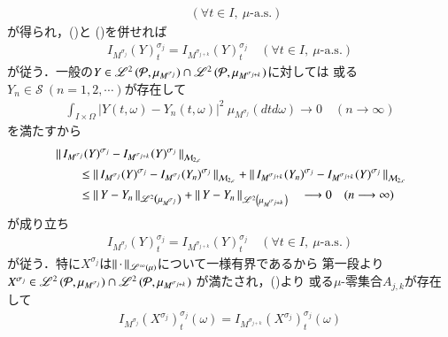 \begin{prf}
\begin{description}
\begin{align}
					\quad (\forall t \in I,\ \mbox{$\mu$-a.s.})
					\label{eq:thm_Ito_integral_on_M_c_loc_and_left_cont_locally_bounded_2}
				\end{align}
				が得られ，()と
				()を併せれば
				\begin{align}
					I_{M^{\sigma_j}}(Y)^{\sigma_j}_t = I_{M^{\sigma_{j+k}}}(Y)^{\sigma_j}_t
					\quad (\forall t \in I,\ \mbox{$\mu$-a.s.})
				\end{align}
				が従う．一般の$Y \in \mathscr{L}^{2} \left(\mathcal{P},\mu_{M^{\sigma_j}}\right) \cap \mathscr{L}^{2} \left(\mathcal{P},\mu_{M^{\sigma_{j+k}}}\right)$に対しては
				或る$Y_n \in \mathcal{S}\ (n=1,2,\cdots)$が存在して
				\begin{align}
					\int_{I \times \Omega} \left| Y(t,\omega) - Y_n(t,\omega) \right|^2\ \mu_{M^{\sigma_j}}(dtd\omega)
					\longrightarrow 0
					\quad (n \longrightarrow \infty)
				\end{align}
				を満たすから
				\begin{align}
					&\left\|\, I_{M^{\sigma_j}}(Y)^{\sigma_j} - I_{M^{\sigma_{j+k}}}(Y)^{\sigma_j}\, \right\|_{\mathcal{M}_{2,c}} \\
					&\qquad \leq \left\|\, I_{M^{\sigma_j}}(Y)^{\sigma_j} - I_{M^{\sigma_j}}(Y_n)^{\sigma_j}\, \right\|_{\mathcal{M}_{2,c}}
						+ \left\|\, I_{M^{\sigma_{j+k}}}(Y_n)^{\sigma_j} - I_{M^{\sigma_{j+k}}}(Y)^{\sigma_j}\, \right\|_{\mathcal{M}_{2,c}} \\
					&\qquad \leq \left\|\, Y - Y_n\, \right\|_{\mathscr{L}^{2} \left(\mu_{M^{\sigma_j}}\right)} + \left\|\, Y - Y_n\, \right\|_{\mathscr{L}^{2} \left(\mu_{M^{\sigma_{j+k}}}\right)}
					\quad \longrightarrow 0 \quad (n \longrightarrow \infty)
				\end{align}
				が成り立ち
				\begin{align}
					I_{M^{\sigma_j}}(Y)^{\sigma_j}_t = I_{M^{\sigma_{j+k}}}(Y)^{\sigma_j}_t
					\quad (\forall t \in I,\ \mbox{$\mu$-a.s.})
					\label{eq:thm_Ito_integral_on_M_c_loc_and_left_cont_locally_bounded_3}
				\end{align}
				が従う．特に$X^{\sigma_j}$は$\left\|\, \cdot\, \right\|_{\mathscr{L}^{\infty} \left(\mu\right)}$について一様有界であるから
				第一段より$X^{\sigma_j} \in \mathscr{L}^{2} \left(\mathcal{P},\mu_{M^{\sigma_j}}\right) \cap \mathscr{L}^{2} \left(\mathcal{P},\mu_{M^{\sigma_{j+k}}}\right)$
				が満たされ，()より
				或る$\mu$-零集合$A_{j,k}$が存在して
				\begin{align}
					I_{M^{\sigma_j}}(X^{\sigma_j})^{\sigma_j}_t(\omega) = I_{M^{\sigma_{j+k}}}(X^{\sigma_j})^{\sigma_j}_t(\omega)

\end{align}
\end{description}
\end{prf}
